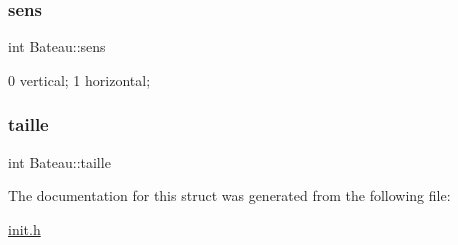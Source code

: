\subsubsection{\texorpdfstring{sens}{sens}}
{\footnotesize\ttfamily int Bateau\+::sens}

0 vertical; 1 horizontal; \hypertarget{structBateau_a1dd818ea44eed67f756400eaac344a95}{}\label{structBateau_a1dd818ea44eed67f756400eaac344a95} 
\subsubsection{\texorpdfstring{taille}{taille}}
{\footnotesize\ttfamily int Bateau\+::taille}



The documentation for this struct was generated from the following file\+:\begin{DoxyCompactItemize}
\item 
\hyperlink{init_8h}{init.\+h}\end{DoxyCompactItemize}
